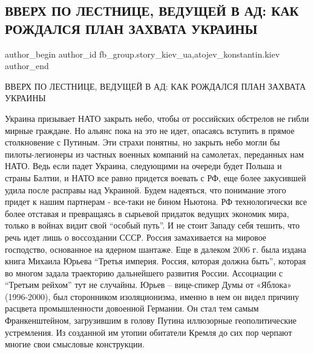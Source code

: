  
 
 
 
 
 
\subsection{ВВЕРХ ПО ЛЕСТНИЦЕ, ВЕДУЩЕЙ В АД: КАК РОЖДАЛСЯ ПЛАН ЗАХВАТА УКРАИНЫ}
\label{sec:04_03_2022.fb.fb_group.story_kiev_ua.2.plan_zahvata_ukrainy}
 
\ifcmt
 author_begin
   author_id fb_group.story_kiev_ua,atojev_konstantin.kiev
 author_end
\fi

ВВЕРХ ПО ЛЕСТНИЦЕ, ВЕДУЩЕЙ В АД: КАК РОЖДАЛСЯ ПЛАН ЗАХВАТА УКРАИНЫ

Украина призывает НАТО закрыть небо, чтобы от российских обстрелов не гибли
мирные граждане. Но альянс пока на это не идет, опасаясь вступить в прямое
столкновение с Путиным. Эти страхи понятны, но закрыть небо могли бы
пилоты-легионеры из частных военных компаний на самолетах, переданных нам НАТО.
Ведь если падет Украина, следующими на очереди будет Польша и страны Балтии, и
НАТО все равно придется воевать с РФ, еще более закусившей удила после расправы
над Украиной. Будем надеяться, что понимание этого придет к нашим партнерам -
все-таки не бином Ньютона. РФ технологически все более отставая и превращаясь в
сырьевой придаток ведущих экономик мира, только в войнах видит свой \enquote{особый
путь}. И не стоит Западу себя тешить, что речь идет лишь о воссоздании СССР.
Россия замахивается на мировое господство, основанное на ядерном шантаже.  Еще
в далеком 2006 г. была издана книга Михаила Юрьева \enquote{Третья империя. Россия,
которая должна быть}, которая во многом задала траекторию дальнейшего развития
России. Ассоциации с \enquote{Третьим рейхом} тут не случайны. Юрьев  – вице-спикер
Думы от «Яблока» (1996-2000), был сторонником изоляционизма, именно в нем он
видел причину расцвета промышленности довоенной Германии. Он стал тем самым
Франкенштейном, загрузившим в голову Путина иллюзорные геополитические
устремления.  Из созданной им утопии обитатели Кремля до сих пор черпают многие
свои смысловые конструкции.

